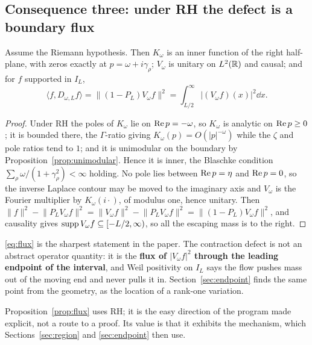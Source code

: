 \subsection{Consequence three: under RH the defect is a boundary flux}

\begin{proposition}\label{prop:flux}
Assume the Riemann hypothesis. Then $K_\omega$ is an inner function of the right
half-plane, with zeros exactly at $p=\omega+i\gamma_\rho$; $V_\omega$ is unitary
on $L^2(\mathbb R)$ and causal; and for $f$ supported in $I_L$,
\begin{equation}\label{eq:flux}
 \langle f,D_{\omega,L}f\rangle=\lVert(1-P_L)V_\omega f\rVert^2
 =\int_{L/2}^{\infty}\big|(V_\omega f)(x)\big|^2\dd x .
\end{equation}
\end{proposition}

\begin{proof}
Under RH the poles of $K_\omega$ lie on $\operatorname{Re} p=-\omega$, so $K_\omega$ is analytic
on $\operatorname{Re} p\geq0$; it is bounded there, the $\Gamma$-ratio giving
$K_\omega(p)=O(|p|^{-\omega})$ while the $\zeta$ and pole ratios tend to $1$; and
it is unimodular on the boundary by Proposition~\ref{prop:unimodular}. Hence it is
inner, the Blaschke condition $\sum_\rho\omega/(1+\gamma_\rho^2)<\infty$ holding.
No pole lies between $\operatorname{Re} p=\eta$ and $\operatorname{Re} p=0$, so the inverse Laplace contour
may be moved to the imaginary axis and $V_\omega$ is the Fourier multiplier by
$K_\omega(i\cdot)$, of modulus one, hence unitary. Then
$\lVert f\rVert^2-\lVert P_LV_\omega f\rVert^2
=\lVert V_\omega f\rVert^2-\lVert P_LV_\omega f\rVert^2
=\lVert(1-P_L)V_\omega f\rVert^2$, and causality gives
$\operatorname{supp} V_\omega f\subseteq[-L/2,\infty)$, so all the escaping mass is to the
right.
\end{proof}

\eqref{eq:flux} is the sharpest statement in the paper. The contraction defect is
not an abstract operator quantity: it is the \textbf{flux of $|V_\omega f|^2$
through the leading endpoint of the interval}, and Weil positivity on $I_L$ says
the flow pushes mass out of the moving end and never pulls it in. Section~\ref{sec:endpoint}
finds the same point from the geometry, as the location of a rank-one variation.

\begin{remark}\label{rem:direction}
Proposition~\ref{prop:flux} uses RH; it is the easy direction of the program made
explicit, not a route to a proof. Its value is that it exhibits the mechanism,
which Sections~\ref{sec:region} and \ref{sec:endpoint} then use.
\end{remark}

